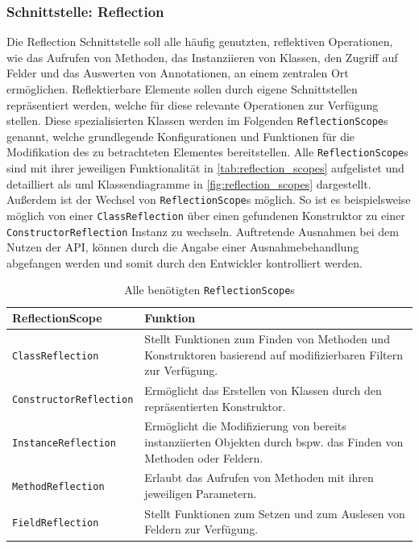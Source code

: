 \subsubsection{Schnittstelle: Reflection}
Die Reflection Schnittstelle soll alle häufig genutzten, reflektiven Operationen, wie das Aufrufen von Methoden, das Instanziieren von Klassen, den Zugriff auf Felder und das Auswerten von Annotationen, an einem zentralen Ort ermöglichen. Reflektierbare Elemente sollen durch eigene Schnittstellen repräsentiert werden, welche für diese relevante Operationen zur Verfügung stellen. Diese spezialisierten Klassen werden im Folgenden \texttt{ReflectionScope}s genannt, welche grundlegende Konfigurationen und Funktionen für die Modifikation des zu betrachteten Elementes bereitstellen. Alle \texttt{ReflectionScope}s sind mit ihrer jeweiligen Funktionalität in \autoref{tab:reflection_scopes} aufgelistet und detailliert als \ac{uml} Klassendiagramme in \autoref{fig:reflection_scopes} dargestellt. Außerdem ist der Wechsel von \texttt{ReflectionScope}s möglich. So ist es beispielsweise möglich von einer \texttt{ClassReflection} über einen gefundenen Konstruktor zu einer \texttt{ConstructorReflection} Instanz zu wechseln. Auftretende Ausnahmen bei dem Nutzen der API, können durch die Angabe einer Ausnahmebehandlung abgefangen werden und somit durch den Entwickler kontrolliert werden.
\begin{table}[H]
	\centering
	\renewcommand*{\arraystretch}{1.3}
	\begin{tabular}{|p{}|p{}|}
		\hline
		ReflectionScope & Funktion\\
		\hline
		\texttt{ClassReflection} & Stellt Funktionen zum Finden von Methoden und Konstruktoren basierend auf modifizierbaren Filtern zur Verfügung.\\
		\hline
		\texttt{ConstructorReflection} & Ermöglicht das Erstellen von Klassen durch den repräsentierten Konstruktor.\\
		\hline
		\texttt{InstanceReflection} & Ermöglicht die Modifizierung von bereits instanziierten Objekten durch bspw. das Finden von Methoden oder Feldern.\\
		\hline
		\texttt{MethodReflection} & Erlaubt das Aufrufen von Methoden mit ihren jeweiligen Parametern.\\
		\hline
		\texttt{FieldReflection} & Stellt Funktionen zum Setzen und zum Auslesen von Feldern zur Verfügung.\\
		\hline
	\end{tabular}
	\caption{Alle benötigten \texttt{ReflectionScope}s}
	\label{tab:reflection_scopes}
\end{table}
